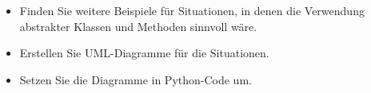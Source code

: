 \documentclass[11pt, a4paper, oneside]{article}
\begin{document}
	
	\begin{itemize}
		\item Finden Sie weitere Beispiele für Situationen, in denen die Verwendung abstrakter Klassen und Methoden sinnvoll wäre.
		\item Erstellen Sie UML-Diagramme für die Situationen.
		\item Setzen Sie die Diagramme in Python-Code um.
	\end{itemize}
\end{document}
